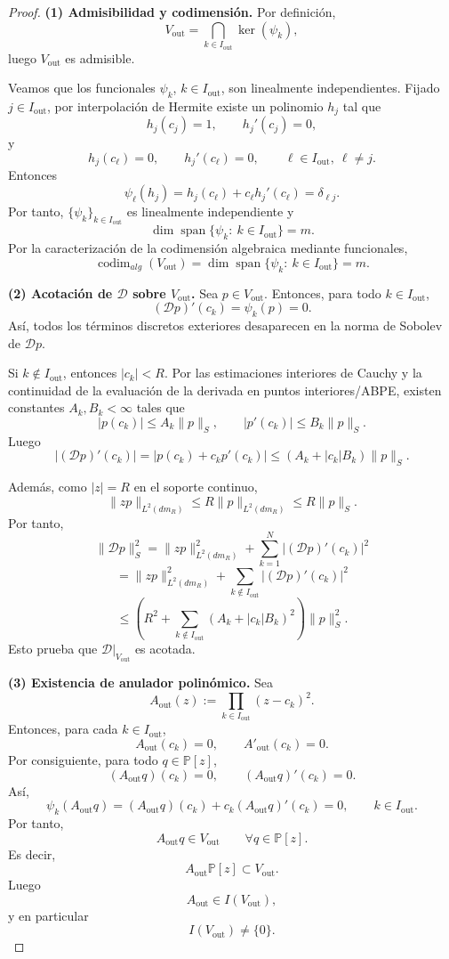\documentclass[12pt,a4paper]{article}
\theoremstyle{definition}
\theoremstyle{remark}
\begin{document}
\begin{proof}
	\textbf{(1) Admisibilidad y codimensión.}
	Por definición,
	\[
		V_{\mathrm{out}}=\bigcap_{k\in I_{\mathrm{out}}}\ker(\psi_k),
	\]
	luego $V_{\mathrm{out}}$ es admisible.

	Veamos que los funcionales $\psi_k$, $k\in I_{\mathrm{out}}$, son linealmente independientes.
	Fijado $j\in I_{\mathrm{out}}$, por interpolación de Hermite existe un polinomio $h_j$ tal que
	\[
		h_j(c_j)=1,\qquad h_j'(c_j)=0,
	\]
	y
	\[
		h_j(c_\ell)=0,\qquad h_j'(c_\ell)=0,
		\qquad \ell\in I_{\mathrm{out}},\ \ell\neq j.
	\]
	Entonces
	\[
		\psi_\ell(h_j)=h_j(c_\ell)+c_\ell h_j'(c_\ell)=\delta_{\ell j}.
	\]
	Por tanto, $\{\psi_k\}_{k\in I_{\mathrm{out}}}$ es linealmente independiente y
	\[
		\dim\operatorname{span}\{\psi_k:\ k\in I_{\mathrm{out}}\}=m.
	\]
	Por la caracterización de la codimensión algebraica mediante funcionales,
	\[
		\operatorname{codim}_{alg}(V_{\mathrm{out}})
		=
		\dim\operatorname{span}\{\psi_k:\ k\in I_{\mathrm{out}}\}
		=
		m.
	\]

	\medskip
	\textbf{(2) Acotación de $\mathcal D$ sobre $V_{\mathrm{out}}$.}
	Sea $p\in V_{\mathrm{out}}$. Entonces, para todo $k\in I_{\mathrm{out}}$,
	\[
		(\mathcal Dp)'(c_k)=\psi_k(p)=0.
	\]
	Así, todos los términos discretos exteriores desaparecen en la norma de Sobolev de
	$\mathcal Dp$.

	Si $k\notin I_{\mathrm{out}}$, entonces $|c_k|<R$. Por las estimaciones interiores de Cauchy
	y la continuidad de la evaluación de la derivada en puntos interiores/ABPE, existen constantes
	$A_k,B_k<\infty$ tales que
	\[
		|p(c_k)|\le A_k\|p\|_S,
		\qquad
		|p'(c_k)|\le B_k\|p\|_S.
	\]
	Luego
	\[
		|(\mathcal Dp)'(c_k)|
		=
		|p(c_k)+c_kp'(c_k)|
		\le
		(A_k+|c_k|B_k)\|p\|_S.
	\]

	Además, como $|z|=R$ en el soporte continuo,
	\[
		\|zp\|_{L^2(dm_R)}\le R\|p\|_{L^2(dm_R)}\le R\|p\|_S.
	\]
	Por tanto,
	\[
		\|\mathcal Dp\|_S^2
		=
		\|zp\|_{L^2(dm_R)}^2+\sum_{k=1}^N |(\mathcal Dp)'(c_k)|^2
	\]
	\[
		=
		\|zp\|_{L^2(dm_R)}^2+\sum_{k\notin I_{\mathrm{out}}}|(\mathcal Dp)'(c_k)|^2
	\]
	\[
		\le
		\left(
		R^2+\sum_{k\notin I_{\mathrm{out}}}(A_k+|c_k|B_k)^2
		\right)\|p\|_S^2.
	\]
	Esto prueba que $\mathcal D|_{V_{\mathrm{out}}}$ es acotada.

	\medskip
	\textbf{(3) Existencia de anulador polinómico.}
	Sea
	\[
		A_{\mathrm{out}}(z):=\prod_{k\in I_{\mathrm{out}}}(z-c_k)^2.
	\]
	Entonces, para cada $k\in I_{\mathrm{out}}$,
	\[
		A_{\mathrm{out}}(c_k)=0,
		\qquad
		A'_{\mathrm{out}}(c_k)=0.
	\]
	Por consiguiente, para todo $q\in\mathbb P[z]$,
	\[
		(A_{\mathrm{out}}q)(c_k)=0,
		\qquad
		(A_{\mathrm{out}}q)'(c_k)=0.
	\]
	Así,
	\[
		\psi_k(A_{\mathrm{out}}q)
		=
		(A_{\mathrm{out}}q)(c_k)+c_k(A_{\mathrm{out}}q)'(c_k)=0,
		\qquad k\in I_{\mathrm{out}}.
	\]
	Por tanto,
	\[
		A_{\mathrm{out}}q\in V_{\mathrm{out}}
		\qquad \forall q\in\mathbb P[z].
	\]
	Es decir,
	\[
		A_{\mathrm{out}}\mathbb P[z]\subset V_{\mathrm{out}}.
	\]
	Luego
	\[
		A_{\mathrm{out}}\in I(V_{\mathrm{out}}),
	\]
	y en particular
	\[
		I(V_{\mathrm{out}})\neq\{0\}.
	\]
\end{proof}
\end{document}
